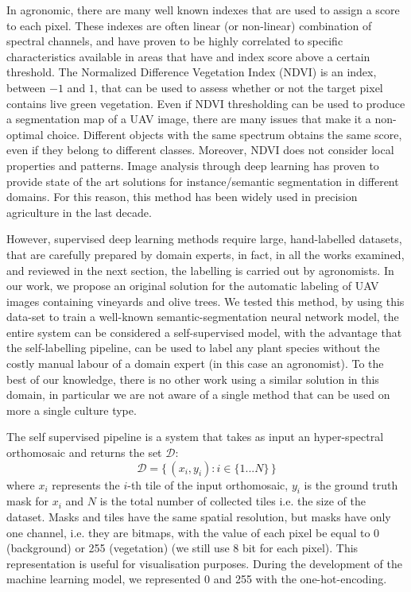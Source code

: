 \documentclass[comsoc,final]{IEEEtran}
\newcommand{\todo}[1]{\textcolor{red}{#1}}
\begin{document}
In agronomic, there are many well known indexes that are used to assign a score to each pixel. These indexes are often linear (or non-linear) combination of spectral channels, and have proven to be highly correlated to specific characteristics available in areas that have and index score above a certain threshold. The Normalized Difference Vegetation Index (NDVI) is an index, between $-1$ and $1$, that can be used to assess whether or not the target pixel contains live green vegetation.
Even if NDVI thresholding can be used to produce a segmentation map of a UAV image, there are many issues that make it a non-optimal choice. Different objects with the same spectrum obtains the same score, even if they belong to different classes. Moreover, NDVI does not consider local properties and patterns. Image analysis through deep learning has proven to provide state of the art solutions for instance/semantic segmentation in different domains. For this reason, this method has been widely used in precision agriculture in the last decade.

However, supervised deep learning methods require large, hand-labelled datasets, that are carefully prepared by domain experts, in fact, in all the works examined, and reviewed in the next section, the labelling is carried out by agronomists. In our work, we propose an original solution for the automatic labeling of UAV images containing vineyards and olive trees. We tested this method, by using this data-set to train a well-known semantic-segmentation neural network model, the entire system can be considered a self-supervised model, with the advantage that the self-labelling pipeline, can be used to label any plant species without the costly manual labour of a domain expert (in this case an agronomist). To the best of our knowledge, there is no other work using a similar solution in this domain, in particular we are not aware of a single method that can be used on more a single culture type. 

The self supervised pipeline is a system that takes as input an hyper-spectral orthomosaic and returns the set $\mathcal{D}$: \[
\mathcal{D} = \{\, (x_i,y_i):i \in \{1...N\}\,\}
\] where $x_i$ represents the $i$-th tile of the input orthomosaic, $y_i$ is the ground truth mask for $x_i$ and $N$ is the total number of collected tiles i.e. the size of the dataset.
Masks and tiles have the same spatial resolution, but masks have only one channel, i.e. they are bitmaps, with the value of each pixel be equal to 0 (background) or 255 (vegetation) (we still use 8 bit for each pixel). This representation is useful for visualisation purposes. During the development of the machine learning model, we represented 0 and 255 with the one-hot-encoding.
\end{document}
